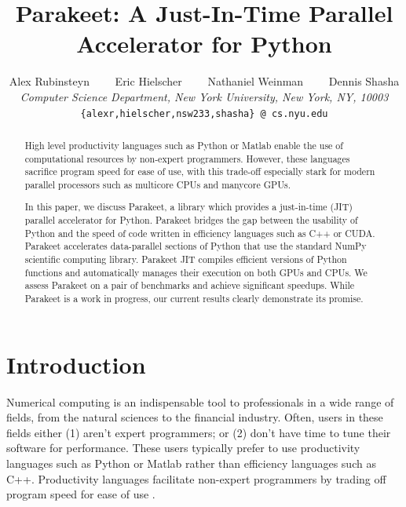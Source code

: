 \documentclass[10pt,twocolumn]{article}
\begin{document}
\title{Parakeet: A Just-In-Time Parallel Accelerator for Python}
\author{
Alex Rubinsteyn \ \ \ \ Eric Hielscher \ \ \ \ Nathaniel Weinman \ \ \ \
Dennis Shasha \\
{\it Computer Science Department, New York University, New York, NY, 10003} \\
\small{\tt \{alexr,hielscher,nsw233,shasha\} @ cs.nyu.edu}
}
\date{}

\newcommand{\MAP}{\impfnt{map}}
\newcommand{\REDUCE}{\impfnt{reduce}}
\newcommand{\SCAN}{\impfnt{scan}}
\newcommand{\ALLPAIRS}{\impfnt{allpairs}}
\newcommand{\concat}{\ensuremath{+\!\!\!\!+\,}}

\setlength\fboxsep{8pt}
\setlength\fboxrule{0.5pt}

\maketitle

\begin{abstract}
High level productivity languages such as Python or Matlab enable the use of computational resources by non-expert programmers.  However, these languages sacrifice program speed for ease of use, with this trade-off especially stark for modern parallel processors such as multicore CPUs and manycore GPUs.

In this paper, we discuss Parakeet, a library which provides a just-in-time (JIT) parallel accelerator for Python.  Parakeet bridges the gap between the usability of Python and the speed of code written in efficiency languages such as C++ or CUDA.  Parakeet accelerates data-parallel sections of Python that use the standard NumPy scientific computing library.  Parakeet JIT compiles efficient versions of Python functions and automatically manages their execution on both GPUs and CPUs.  We assess Parakeet on a pair of benchmarks and achieve significant speedups.  While Parakeet is a work in progress, our current results clearly demonstrate its promise.
\end{abstract}

\section{Introduction}
\label{Intro}
Numerical computing is an indispensable tool to professionals in a wide range of fields, from the natural sciences to the financial industry.  Often, users in these fields either (1) aren't expert programmers; or (2) don't have time to tune their software for performance.  These users typically prefer to use productivity languages such as Python or Matlab rather than efficiency languages such as C++.  Productivity languages facilitate non-expert programmers by trading off program speed for ease of use \cite{Pre03}.
\end{document}
